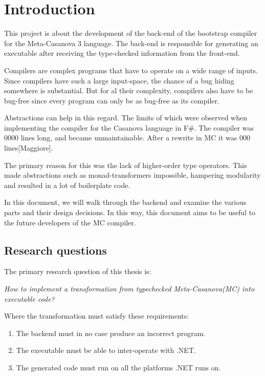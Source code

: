 \section{Introduction}
This project is about the development of the back-end of the bootstrap compiler for the Meta-Casanova 3 language.
The back-end is responsible for generating an executable after receiving the type-checked information from the front-end.

Compilers are complex programs that have to operate on a wide range of inputs.
Since compilers have such a large input-space, the chance of a bug hiding somewhere is substantial. 
But for al their complexity, compilers also have to be bug-free since every program can only be as bug-free as its compiler.

Abstractions can help in this regard.
The limits of which were observed when implementing the compiler for the Casanova language in F\#.
The compiler was 0000 lines long, and became unmaintainable.
After a rewrite in MC it was 000 lines[Maggiore].

The primary reason for this was the lack of higher-order type operators.
This made abstractions such as monad-transformers impossible, hampering modularity and resulted in a lot of boilerplate code.

In this document, we will walk through the backend and examine the various parts and their design decisions.
In this way, this document aims to be useful to the future developers of the MC compiler.

\subsection{Research questions}\label{research_questions}

The primary research question of this thesis is:

\textit{How to implement a transformation from typechecked Meta-Casanova(MC) into executable code?}

Where the transformation must satisfy these requirements:
\begin{enumerate}
    \item The backend must in no case produce an incorrect program.
    \item The executable must be able to inter-operate with .NET.
    \item The generated code must run on all the platforms .NET runs on.
\end{enumerate}

